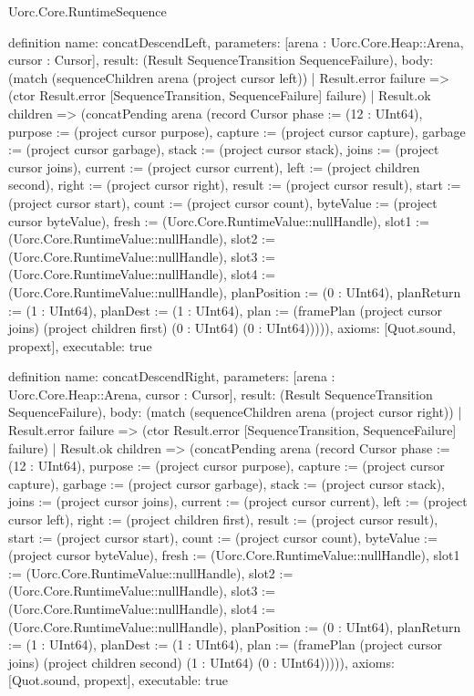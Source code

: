 \begin{lexlean}{Uorc.Core.RuntimeSequence}
\begin{semanticmodule}
definition{
  name: concatDescendLeft,
  parameters: [arena : Uorc.Core.Heap::Arena, cursor : Cursor],
  result: (Result SequenceTransition SequenceFailure),
  body: (match (sequenceChildren arena (project cursor left))
    | Result.error failure => (ctor Result.error [SequenceTransition, SequenceFailure] failure)
    | Result.ok children => (concatPending arena (record Cursor {phase := (12 : UInt64), purpose := (project cursor purpose), capture := (project cursor capture), garbage := (project cursor garbage), stack := (project cursor stack), joins := (project cursor joins), current := (project cursor current), left := (project children second), right := (project cursor right), result := (project cursor result), start := (project cursor start), count := (project cursor count), byteValue := (project cursor byteValue), fresh := (Uorc.Core.RuntimeValue::nullHandle), slot1 := (Uorc.Core.RuntimeValue::nullHandle), slot2 := (Uorc.Core.RuntimeValue::nullHandle), slot3 := (Uorc.Core.RuntimeValue::nullHandle), slot4 := (Uorc.Core.RuntimeValue::nullHandle), planPosition := (0 : UInt64), planReturn := (1 : UInt64), planDest := (1 : UInt64), plan := (framePlan (project cursor joins) (project children first) (0 : UInt64) (0 : UInt64))}))),
  axioms: [Quot.sound, propext],
  executable: true
}

definition{
  name: concatDescendRight,
  parameters: [arena : Uorc.Core.Heap::Arena, cursor : Cursor],
  result: (Result SequenceTransition SequenceFailure),
  body: (match (sequenceChildren arena (project cursor right))
    | Result.error failure => (ctor Result.error [SequenceTransition, SequenceFailure] failure)
    | Result.ok children => (concatPending arena (record Cursor {phase := (12 : UInt64), purpose := (project cursor purpose), capture := (project cursor capture), garbage := (project cursor garbage), stack := (project cursor stack), joins := (project cursor joins), current := (project cursor current), left := (project cursor left), right := (project children first), result := (project cursor result), start := (project cursor start), count := (project cursor count), byteValue := (project cursor byteValue), fresh := (Uorc.Core.RuntimeValue::nullHandle), slot1 := (Uorc.Core.RuntimeValue::nullHandle), slot2 := (Uorc.Core.RuntimeValue::nullHandle), slot3 := (Uorc.Core.RuntimeValue::nullHandle), slot4 := (Uorc.Core.RuntimeValue::nullHandle), planPosition := (0 : UInt64), planReturn := (1 : UInt64), planDest := (1 : UInt64), plan := (framePlan (project cursor joins) (project children second) (1 : UInt64) (0 : UInt64))}))),
  axioms: [Quot.sound, propext],
  executable: true
}


\end{semanticmodule}
\end{lexlean}

